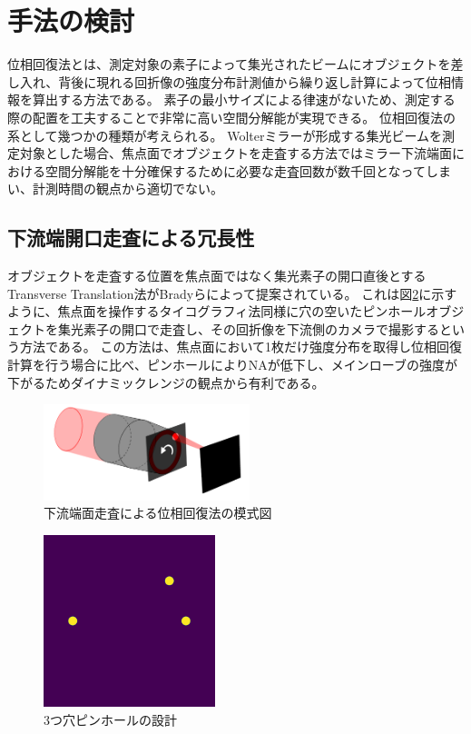 \documentclass[a4j]{jarticle}
\begin{document}
\section{手法の検討}

位相回復法とは、測定対象の素子によって集光されたビームにオブジェクトを差し入れ、背後に現れる回折像の強度分布計測値から繰り返し計算によって位相情報を算出する方法である。
素子の最小サイズによる律速がないため、測定する際の配置を工夫することで非常に高い空間分解能が実現できる。
位相回復法の系として幾つかの種類が考えられる。
Wolterミラーが形成する集光ビームを測定対象とした場合、焦点面でオブジェクトを走査する方法ではミラー下流端面における空間分解能を十分確保するために必要な走査回数が数千回となってしまい、計測時間の観点から適切でない。

\subsection{下流端開口走査による冗長性}
\label{chap3_transverse_introduction}

オブジェクトを走査する位置を焦点面ではなく集光素子の開口直後とするTransverse Translation法がBradyらによって提案されている。\cite{Brady2009}
これは図\ref{fig:transverse_schematic}に示すように、焦点面を操作するタイコグラフィ法同様に穴の空いたピンホールオブジェクトを集光素子の開口で走査し、その回折像を下流側のカメラで撮影するという方法である。
この方法は、焦点面において1枚だけ強度分布を取得し位相回復計算を行う場合に比べ、ピンホールによりNAが低下し、メインローブの強度が下がるためダイナミックレンジの観点から有利である。

\begin{figure}[!ht]
\centering
\includegraphics[width=6cm]{../thesis/chap3/figure/transverse_schematic.png}
\caption{下流端面走査による位相回復法の模式図}
\label{fig:transverse_schematic}
\end{figure}

\begin{figure}[!ht]
\centering
\includegraphics[width=5cm]{../thesis/chap3/figure/three_pinhole_mask.png}
\caption{3つ穴ピンホールの設計}
\label{fig:transverse_schematic}
\end{figure}
\end{document}
